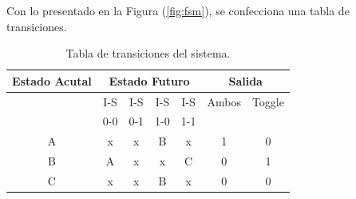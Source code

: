 Con lo presentado en la Figura (\ref{fig:fsm}), se confecciona una tabla de transiciones.
\begin{table}[H]
\centering
\begin{tabular}{|c|cccc|cc|}
\hline
\textbf{Estado Acutal} & \multicolumn{4}{c|}{\textbf{Estado Futuro}} & \multicolumn{2}{c|}{\textbf{Salida}} \\ \hline
                       & I-S       & I-S       & I-S      & I-S               & Ambos        & Toggle        \\
                       & 0-0       & 0-1       & 1-0      & 1-1                  &            &           \\ \hline
A                      & x         & x         & B        & x                   & 1          & 0         \\ \cline{1-1}
B                      & A         & x         & x        & C                  & 0          & 1         \\ \cline{1-1}
C                      & x         & x         & B        & x                  & 0        & 0  \\ \hline
\end{tabular}
\caption{Tabla de transiciones del sistema.}
\label{tab:estados}
\end{table}


